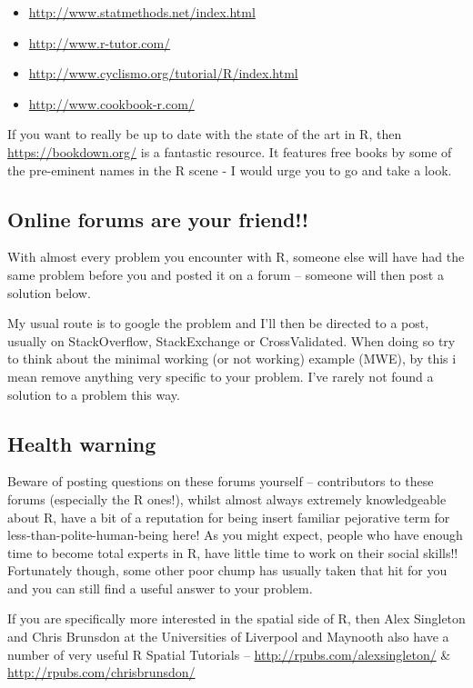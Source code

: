 \documentclass[]{book}
\begin{document}
\begin{itemize}
\item
  \url{http://www.statmethods.net/index.html}
\item
  \url{http://www.r-tutor.com/}
\item
  \url{http://www.cyclismo.org/tutorial/R/index.html}
\item
  \url{http://www.cookbook-r.com/}
\end{itemize}

If you want to really be up to date with the state of the art in R, then \url{https://bookdown.org/} is a fantastic resource. It features free books by some of the pre-eminent names in the R scene - I would urge you to go and take a look.

\hypertarget{online-forums-are-your-friend}{%
\subsection{Online forums are your friend!!}\label{online-forums-are-your-friend}}

With almost every problem you encounter with R, someone else will have had the same problem before you and posted it on a forum -- someone will then post a solution below.

My usual route is to google the problem and I'll then be directed to a post, usually on StackOverflow, StackExchange or CrossValidated. When doing so try to think about the minimal working (or not working) example (MWE), by this i mean remove anything very specific to your problem. I've rarely not found a solution to a problem this way.

\hypertarget{health-warning}{%
\subsection{Health warning}\label{health-warning}}

Beware of posting questions on these forums yourself -- contributors to these forums (especially the R ones!), whilst almost always extremely knowledgeable about R, have a bit of a reputation for being insert familiar pejorative term for less-than-polite-human-being here! As you might expect, people who have enough time to become total experts in R, have little time to work on their social skills!! Fortunately though, some other poor chump has usually taken that hit for you and you can still find a useful answer to your problem.

If you are specifically more interested in the spatial side of R, then Alex Singleton and Chris Brunsdon at the Universities of Liverpool and Maynooth also have a number of very useful R Spatial Tutorials -- \url{http://rpubs.com/alexsingleton/} \& \url{http://rpubs.com/chrisbrunsdon/}
\end{document}
